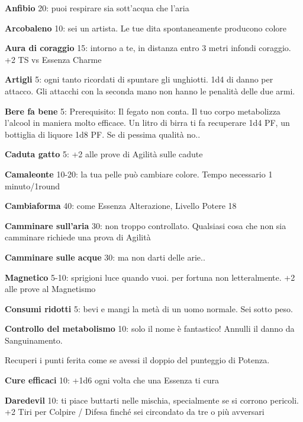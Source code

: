 \documentclass[a4paper,11pt,twoside,openany]{book}
\begin{document}
\textbf{Anfibio} 20: puoi respirare sia sott'acqua che l'aria

\textbf{Arcobaleno} 10: sei un artista. Le tue dita spontaneamente
producono colore

\textbf{Aura di coraggio} 15: intorno a te, in distanza entro 3 metri infondi coraggio. +2 TS vs Essenza Charme

\textbf{Artigli} 5: ogni tanto ricordati di spuntare gli unghiotti. 1d4 di danno per attacco. Gli attacchi con la seconda mano non hanno le penalità delle due armi.

\textbf{Bere fa bene} 5: Prerequisito: Il fegato non conta. Il tuo corpo metabolizza l'alcool in maniera molto efficace. Un litro di birra ti fa recuperare 1d4 PF, un bottiglia di liquore 1d8 PF. Se di pessima qualità no.. 

\textbf{Caduta gatto} 5: +2 alle prove di Agilità sulle cadute

\textbf{Camaleonte} 10-20: la tua pelle può cambiare colore. Tempo necessario 1 minuto/1round

\textbf{Cambiaforma} 40: come Essenza Alterazione, Livello Potere 18

\textbf{Camminare sull'aria} 30: non troppo controllato. Qualsiasi cosa che non sia camminare richiede una prova di Agilità

\textbf{Camminare sulle acque}  30: ma non darti delle arie..

\textbf{Magnetico} 5-10: sprigioni luce quando vuoi. per fortuna non letteralmente. +2 alle prove al Magnetismo

\textbf{Consumi ridotti} 5: bevi e mangi la metà di un uomo normale. Sei sotto peso.

\textbf{Controllo del metabolismo}  10: solo il nome è fantastico! Annulli il danno da Sanguinamento.

Recuperi i punti ferita come se avessi il doppio del punteggio di Potenza.

\textbf{Cure efficaci} 10: +1d6 ogni volta che una Essenza
ti cura

\textbf{Daredevil} 10: ti piace buttarti nelle mischia, specialmente se si corrono pericoli. +2 Tiri per Colpire / Difesa finché sei circondato da tre o più avversari
\end{document}
